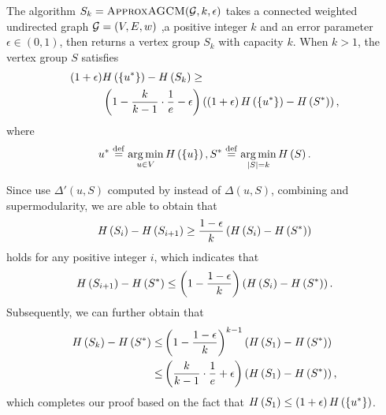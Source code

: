 \documentclass[10pt,journal,compsoc,twocolumn,twoside]{IEEEtran}
\begin{document}

\begin{theorem}
    The algorithm \(S_k=\textsc{ApproxAGCM}(\mathcal{G},k,\epsilon)\) takes a connected weighted undirected graph \(\mathcal{G}=(V,E,w)\) ,a positive integer \(k\) and an error parameter \(\epsilon\in(0,1)\), then returns a vertex group \(S_k\) with capacity \(k\). When \(k>1\), the vertex group \(S\) satisfies
    \begin{align*}
        \left( 1+\epsilon \right) & H\left(\left\{u^* \right\}\right)-H\left(S_k\right)\ge                                                                         \\
                           & \left( 1-\frac{k}{k-1}\cdot\frac{1}{e}-\epsilon \right)\left( \left( 1+\epsilon \right)H\left(\left\{u^* \right\}\right)-H\left(S^*\right) \right),
    \end{align*}
    where
    \[u^*\stackrel{\mathrm{def}}{=}\operatorname*{arg\,min}_{u\in V}H\left(\left\{u \right\}\right),S^*\stackrel{\mathrm{def}}{=}\operatorname*{arg\,min}_{\left|S \right|=k}H\left(S\right).\]
\end{theorem}
\begin{IEEEproof}
    Since  use \(\Delta'(u,S)\) computed by  instead of \(\Delta(u,S)\), combining  and supermodularity, we are able to obtain that
    \begin{equation*}
        H\left(S_i\right)-H\left(S_{i+1}\right)\ge\frac{1-\epsilon}{k}\left( H\left(S_i\right)-H\left(S^*\right) \right)
    \end{equation*}
    holds for any positive integer \(i\), which indicates that
    \begin{equation*}
        H\left(S_{i+1}\right)-H\left(S^*\right)\le\left( 1-\frac{1-\epsilon}{k} \right)\left( H\left(S_i\right)-H\left(S^*\right) \right).
    \end{equation*}
    Subsequently, we can further obtain that
    \begin{align*}
        H\left(S_k\right)-H\left(S^*\right) \le & \left( 1-\frac{1-\epsilon}{k} \right)^{k-1}\left( H\left(S_1\right)-H\left(S^*\right) \right)            \\
        \le                       & \left( \frac{k}{k-1}\cdot\frac{1}{e}+\epsilon \right)\left( H\left(S_1\right)-H\left(S^*\right) \right),
    \end{align*}
    which completes our proof based on the fact that \(H\left(S_1\right)\le\left( 1+\epsilon \right)H\left(\left\{u^* \right\}\right)\).
\end{IEEEproof}
\end{document}
